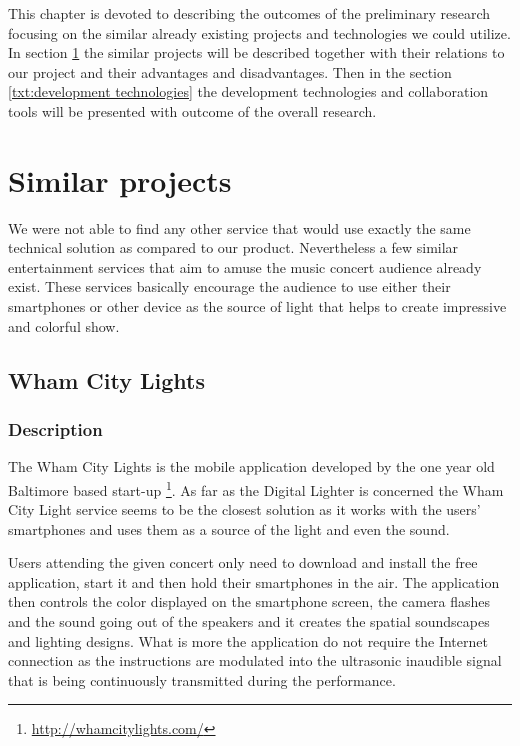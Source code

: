 This chapter is devoted to describing the outcomes of the preliminary research focusing on the similar already existing projects and technologies we could utilize.
In section \ref{txt:similar_projects} the similar projects will be described together with their relations to our project and their advantages and disadvantages. 
Then in the section \ref{txt:development technologies} the development technologies and collaboration tools will be presented with outcome of the overall research. 


\section{Similar projects} \label{txt:similar_projects}

We were not able to find any other service that would use exactly the same technical solution as compared to our product. 
Nevertheless a few similar entertainment services that aim to amuse the music concert audience already exist. 
These services basically encourage the audience to use either their smartphones or other device as the source of light that helps to create impressive and colorful show.


\subsection{Wham City Lights}

\subsubsection{Description}
The Wham City Lights is the mobile application developed by the one year old Baltimore based start-up \footnote{\url{http://whamcitylights.com/}}. 
As far as the Digital Lighter is concerned the Wham City Light service seems to be the closest solution as it works with the users' smartphones and uses them as a source of the light and even the sound.

Users attending the given concert only need to download and install the free application, start it and then hold their smartphones in the air.
The application then controls the color displayed on the smartphone screen, the camera flashes and the sound going out of the speakers and it creates the spatial soundscapes and lighting designs.
What is more the application do not require the Internet connection as the instructions are modulated into the ultrasonic inaudible signal that is being continuously transmitted during the performance.

